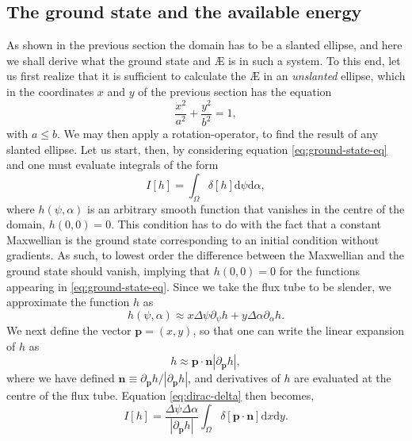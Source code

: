 \subsection{The ground state and the available energy}
As shown in the previous section the domain has to be a slanted ellipse, and here we shall derive what the ground state and \AE{} is in such a system. To this end, let us first realize that it is sufficient to calculate the \AE{} in an {\it unslanted} ellipse, which in the coordinates $x$ and $y$ of the previous section has the equation
\begin{equation}
    \frac{x^2}{a^2} + \frac{y^2}{b^2} = 1,
    \label{eq: circle equation}
\end{equation}
with $a \leq b$. We may then apply a rotation-operator, to find the result of any slanted ellipse. Let us start, then, by considering equation \eqref{eq:ground-state-eq} and one must evaluate integrals of the form
\begin{equation}
    I[h] = \int_\Omega \delta[h] \mathrm{d}\psi \mathrm{d}\alpha,
    \label{eq:dirac-delta}
\end{equation}
where $h(\psi,\alpha)$ is an arbitrary smooth function that vanishes in the centre of the domain, $h(0,0)=0$. This condition has to do with the fact that a constant Maxwellian is the ground state corresponding to an initial condition without gradients. As such, to lowest order the difference between the Maxwellian and the ground state should vanish, implying that $h(0,0)=0$ for the functions appearing in \eqref{eq:ground-state-eq}. Since we take the flux tube to be slender, we approximate the function $h$ as
\begin{equation}
    h(\psi,\alpha) \approx x \Delta \psi \partial_\psi h + y \Delta \alpha \partial_\alpha h.
\end{equation} 
We next define the vector $\boldsymbol{p} = \left( x, y \right)$, so that one can write the linear expansion of $h$ as
\begin{equation}
    h \approx \boldsymbol{p} \cdot \boldsymbol{n} |\partial_{\boldsymbol{p}} h|,
\end{equation}
where we have defined $\boldsymbol{n} \equiv \partial_{\boldsymbol{p}} h/ |\partial_{\boldsymbol{p}} h| $, and derivatives of $h$ are evaluated at the centre of the flux tube. Equation \eqref{eq:dirac-delta} then becomes,
\begin{equation}
    I[h] = \frac{\Delta \psi \Delta \alpha }{|\partial_{\boldsymbol{p}} h|} \int_\Omega \delta[\boldsymbol{p} \cdot \boldsymbol{n}] \mathrm{d}x \mathrm{d}y.
\end{equation}
